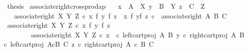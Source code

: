 \begin{isabellebody}
\ {\isacharquery}{\kern0pt}thesis\isacommand{{\isachardot}{\kern0pt}}\isamarkupfalse%
\isanewline
{}\isamarkupfalse%
%
\endisatagproof
{\isafoldproof}%
%
\isadelimproof
\isanewline
%
\endisadelimproof
\isanewline
{}\isamarkupfalse%
\ associate{\isacharunderscore}{\kern0pt}right{\isacharunderscore}{\kern0pt}crossprod{\isacharunderscore}{\kern0pt}ap{\isacharcolon}{\kern0pt}\isanewline
\ \ \ {\isachardoublequoteopen}x\ {\isacharcolon}{\kern0pt}\ A\ {\isasymrightarrow}\ X{\isachardoublequoteclose}\ {\isachardoublequoteopen}y\ {\isacharcolon}{\kern0pt}\ B\ {\isasymrightarrow}\ Y{\isachardoublequoteclose}\ {\isachardoublequoteopen}z\ {\isacharcolon}{\kern0pt}\ C\ {\isasymrightarrow}\ Z{\isachardoublequoteclose}\isanewline
\ \ \ {\isachardoublequoteopen}associate{\isacharunderscore}{\kern0pt}right\ X\ Y\ Z\ {\isasymcirc}\isactrlsub c\ {\isacharparenleft}{\kern0pt}{\isacharparenleft}{\kern0pt}x\ {\isasymtimes}\isactrlsub f\ y{\isacharparenright}{\kern0pt}\ {\isasymtimes}\isactrlsub f\ z{\isacharparenright}{\kern0pt}\ {\isacharequal}{\kern0pt}\ {\isacharparenleft}{\kern0pt}x\ {\isasymtimes}\isactrlsub f\ {\isacharparenleft}{\kern0pt}y{\isasymtimes}\isactrlsub f\ z{\isacharparenright}{\kern0pt}{\isacharparenright}{\kern0pt}\ {\isasymcirc}\isactrlsub c\ \ associate{\isacharunderscore}{\kern0pt}right\ A\ B\ C{\isachardoublequoteclose}\isanewline
%
\isadelimproof
%
\endisadelimproof
%
\isatagproof
{}\isamarkupfalse%
{\isacharminus}{\kern0pt}\isanewline
\ \ \isamarkupfalse%
\ {\isachardoublequoteopen}associate{\isacharunderscore}{\kern0pt}right\ X\ Y\ Z\ {\isasymcirc}\isactrlsub c\ {\isacharparenleft}{\kern0pt}{\isacharparenleft}{\kern0pt}x\ {\isasymtimes}\isactrlsub f\ y{\isacharparenright}{\kern0pt}\ {\isasymtimes}\isactrlsub f\ z{\isacharparenright}{\kern0pt}\ {\isacharequal}{\kern0pt}\isanewline
\ \ \ \ \ \ \ \ associate{\isacharunderscore}{\kern0pt}right\ X\ Y\ Z\ {\isasymcirc}\isactrlsub c\ {\isasymlangle}{\isasymlangle}x\ \ {\isasymcirc}\isactrlsub c\ left{\isacharunderscore}{\kern0pt}cart{\isacharunderscore}{\kern0pt}proj\ A\ B{\isacharcomma}{\kern0pt}\ y\ {\isasymcirc}\isactrlsub c\ right{\isacharunderscore}{\kern0pt}cart{\isacharunderscore}{\kern0pt}proj\ A\ B{\isasymrangle}\ {\isasymcirc}\isactrlsub c\ left{\isacharunderscore}{\kern0pt}cart{\isacharunderscore}{\kern0pt}proj\ {\isacharparenleft}{\kern0pt}A{\isasymtimes}\isactrlsub cB{\isacharparenright}{\kern0pt}\ C{\isacharcomma}{\kern0pt}\ z\ {\isasymcirc}\isactrlsub c\ right{\isacharunderscore}{\kern0pt}cart{\isacharunderscore}{\kern0pt}proj\ {\isacharparenleft}{\kern0pt}A\ {\isasymtimes}\isactrlsub c\ B{\isacharparenright}{\kern0pt}\ C{\isasymrangle}{\isachardoublequoteclose}\isanewline

\end{isabellebody}
